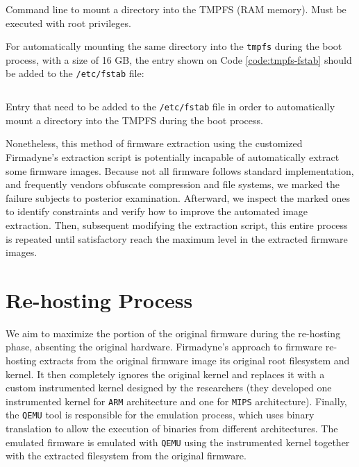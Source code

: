 \begin{listing}[H]
\inputminted[breaklines]{text}{Code/tmpfs-mount}
\caption{Command line to mount a directory into the TMPFS (RAM memory). Must be executed with root privileges.}
\label{code:tmpfs-manual}
\end{listing}

For automatically mounting the same directory into the {\tt tmpfs} during the boot process, with a size of 16 GB, the entry shown on Code \ref{code:tmpfs-fstab} should be added to the {\tt /etc/fstab} file:

\begin{listing}[H]
\inputminted[breaklines]{text}{Code/tmpfs-fstab}
\caption{Entry that need to be added to the {\tt /etc/fstab} file in order to automatically mount a directory into the TMPFS during the boot process.}
\label{code:tmpfs-fstab}
\end{listing}


Nonetheless, this method of firmware extraction using the customized Firmadyne's \cite{firmadyne} extraction script is potentially incapable of automatically extract some firmware images. Because not all firmware follows standard implementation, and frequently vendors obfuscate compression and file systems, we marked the failure subjects to posterior examination. Afterward, we inspect the marked ones to identify constraints and verify how to improve the automated image extraction. Then, subsequent modifying the extraction script, this entire process is repeated until satisfactory reach the maximum level in the extracted firmware images.

\section{Re-hosting Process}
\label{sec:re-hosting}

We aim to maximize the portion of the original firmware during the re-hosting phase, absenting the original hardware. Firmadyne's approach to firmware re-hosting extracts from the original firmware image its original root filesystem and kernel. It then completely ignores the original kernel and replaces it with a custom instrumented kernel designed by the researchers (they developed one instrumented kernel for {\tt ARM} architecture and one for {\tt MIPS} architecture). Finally, the {\tt QEMU} tool is responsible for the emulation process, which uses binary translation to allow the execution of binaries from different architectures. The emulated firmware is emulated with {\tt QEMU} using the instrumented kernel together with the extracted filesystem from the original firmware.

